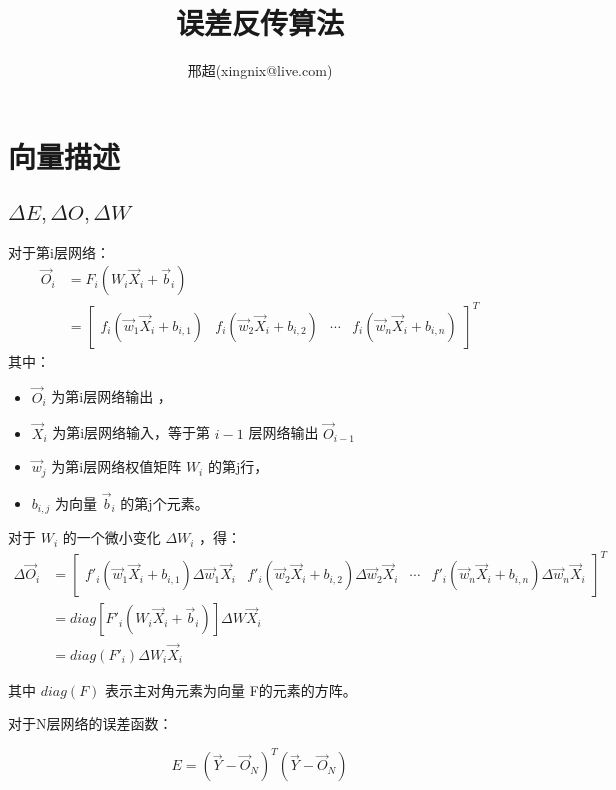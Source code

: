\documentclass{article}
\begin{document}
\title{误差反传算法}
\author{邢超(xingnix@live.com)}
\maketitle

\section{向量描述}
\subsection{ $\Delta E,\Delta O,\Delta W$}

对于第i层网络：
\begin{align*}
\vec O_i &=F_i(W_i\vec X_i+\vec b_i)\\
&=\begin{bmatrix}
f_i(\vec w_1 \vec X_i+b_{i,1})  &  f_i(\vec w_2 \vec X_i+b_{i,2}) & \cdots & f_i(\vec w_n \vec X_i +b_{i,n})
\end{bmatrix}^T
\end{align*}
其中：
\begin{itemize}
\item $\vec O_i$ 为第i层网络输出 ，
\item $\vec X_i$ 为第i层网络输入，等于第 $i-1$ 层网络输出 $\vec O_{i-1}$
\item $\vec w_j$ 为第i层网络权值矩阵 $W_i$ 的第j行， 
\item $b_{i,j}$ 为向量 $\vec b_i$ 的第j个元素。
\end{itemize}

对于 $W_i$ 的一个微小变化 $\Delta W_i$ ，得：
\begin{align*}
\Delta \vec O_i &=\begin{bmatrix}
f'_i(\vec w_1 \vec X_i+b_{i,1})\Delta \vec w_1 \vec X_i  &  f'_i(\vec w_2 \vec X_i+b_{i,2})\Delta \vec w_2 \vec X_i & \cdots & f'_i(\vec w_n \vec X_i +b_{i,n})\Delta \vec w_n \vec X_i
\end{bmatrix}^T \\
&=diag[F'_i(W_i\vec X_i+\vec b_i)]\Delta W\vec X_i \\
&=diag(F'_i)\Delta W_i \vec X_i
\end{align*}


其中 $diag(F)$ 表示主对角元素为向量 F的元素的方阵。



对于N层网络的误差函数：

\[E=(\vec{Y}-\vec O_N)^T(\vec{Y}-\vec O_N)\]
\end{document}
